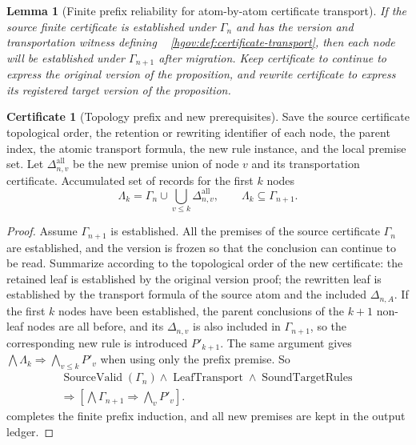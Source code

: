 \documentclass[12pt,a4paper,openany,notitlepage]{report}
\theoremstyle{plain}
\newtheorem{lemma}[theorem]{Lemma}
\theoremstyle{definition}
\newtheorem*{certificate}{Certificate}
\theoremstyle{remark}
\begin{document}
\begin{CJK*}
\begin{lemma}
[Finite prefix reliability for atom-by-atom certificate transport]\label{hgov:lem:transport-prefix}
If the source finite certificate is established under $\Gamma_n$ and has the version and transportation witness defining ~ \ref{hgov:def:certificate-transport}, then each node will be established under $\Gamma_{n+1}$ after migration. Keep certificate to continue to express the original version of the proposition, and rewrite certificate to express its registered target version of the proposition.\end{lemma}
\begin{certificate}
[Topology prefix and new prerequisites]Save the source certificate topological order, the retention or rewriting identifier of each node, the parent index, the atomic transport formula, the new rule instance, and the local premise set. Let $\Delta_{n,v}^{\mathrm{all}}$ be the new premise union of node $v$ and its transportation certificate. Accumulated set of records for the first $k$ nodes \[
 \Lambda_k=\Gamma_n\cup
 \bigcup_{v\le k}\Delta_{n,v}^{\mathrm{all}},
 \qquad \Lambda_k\subseteq\Gamma_{n+1}.
\]\end{certificate}
\begin{proof}
Assume $\Gamma_{n+1}$ is established. All the premises of the source certificate $\Gamma_n$ are established, and the version is frozen so that the conclusion can continue to be read. Summarize according to the topological order of the new certificate: the retained leaf is established by the original version proof; the rewritten leaf is established by the transport formula of the source atom and the included $\Delta_{n,A}$. If the first $k$ nodes have been established, the parent conclusions of the $k+1$ non-leaf nodes are all before, and its $\Delta_{n,v}$ is also included in $\Gamma_{n+1}$, so the corresponding new rule is introduced $P'_{k+1}$. The same argument gives $\bigwedge\Lambda_k\Rightarrow\bigwedge_{v\le k}P'_v$ when using only the prefix premise. So \[
 \begin{gathered}
 \operatorname{SourceValid}(\Gamma_n)
 \land\operatorname{LeafTransport}
 \land\operatorname{SoundTargetRules}\\
 \Longrightarrow
 \left[
 \bigwedge\Gamma_{n+1}
 \Rightarrow\bigwedge_{v}P'_v
 \right].
 \end{gathered}
\] completes the finite prefix induction, and all new premises are kept in the output ledger.\end{proof}



\end{CJK*}
\end{document}
